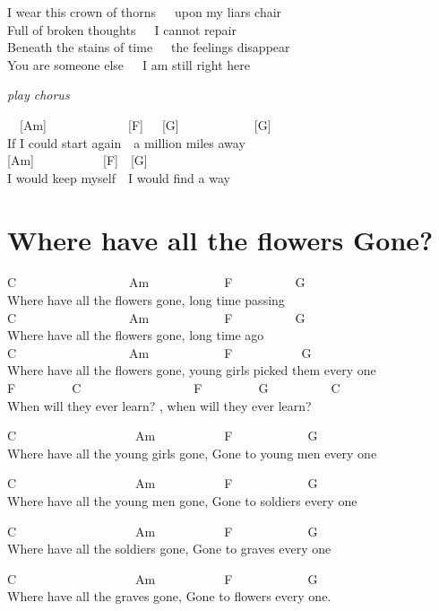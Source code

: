 \documentclass[
  letterpaper,
  a5paper]{memoir}
\begin{document}
I wear this crown of thorns~~~upon my liar\textquotesingle s chair\\
Full of broken thoughts~~~I cannot repair\\
Beneath the stains of time~~~the feelings disappear\\
You are someone else~~~I am still right here

\emph{play chorus}

~~{[}Am{]}~~~~~~~~~~~~~{[}F{]}~~~{[}G{]}~~~~~~~~~~~~{[}G{]}\\
If I could start again~~a million miles away\\
{[}Am{]}~~~~~~~~~~~{[}F{]}~~{[}G{]}\\
I would keep myself~~I would find a way

\hypertarget{where-have-all-the-flowers-gone}{%
\chapter{Where have all the flowers
Gone?}\label{where-have-all-the-flowers-gone}}

C~~~~~~~~~~~~~~~~~~Am~~~~~~~~~~~~F~~~~~~~~~~G\\
Where have all the flowers gone, long time passing\\
C~~~~~~~~~~~~~~~~~~Am~~~~~~~~~~~~F~~~~~~~~~~G\\
Where have all the flowers gone, long time ago\\
C~~~~~~~~~~~~~~~~~~Am~~~~~~~~~~~~F~~~~~~~~~~~G\\
Where have all the flowers gone, young girls picked them every one\\
F~~~~~~~~~C~~~~~~~~~~~~~~~~~~F~~~~~~~~~G~~~~~~~~~~C~~~\\
When will they ever learn? , when will they ever learn?

C~~~~~~~~~~~~~~~~~~~Am~~~~~~~~~~~F~~~~~~~~~~~~G\\
Where have all the young girls gone, Gone to young men every one

C~~~~~~~~~~~~~~~~~~~Am~~~~~~~~~~~F~~~~~~~~~~~~G\\
Where have all the young men gone, Gone to soldiers every one

C~~~~~~~~~~~~~~~~~~~Am~~~~~~~~~~~F~~~~~~~~~~~~G~~~\\
Where have all the soldiers gone, Gone to graves every one

C~~~~~~~~~~~~~~~~~~~Am~~~~~~~~~~~F~~~~~~~~~~~~G~~\\
Where have all the graves gone, Gone to flowers every one.
\end{document}
